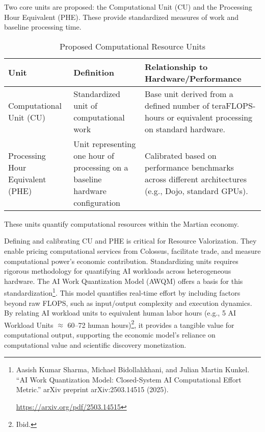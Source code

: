 \documentclass[fontsize=10pt, oneside, DIV=calc]{scrartcl}
\begin{document}
\medskip

\noindent
Two core units are proposed: the Computational Unit (CU) and the Processing Hour Equivalent (PHE). These provide standardized measures of work and baseline processing time.

\medskip

\noindent
\begin{table}[htbp]
\centering
\caption{Proposed Computational Resource Units}
\begin{tabularx}{\textwidth}{|X|X|X|}
  \hline
  \textbf{Unit} & \textbf{Definition} & \textbf{Relationship to Hardware/Performance} \\ \hline
  Computational Unit (CU) & Standardized unit of computational work & Base unit derived from a defined number of teraFLOPS-hours or equivalent processing on standard hardware.\\ \hline
  Processing Hour Equivalent (PHE) & Unit representing one hour of processing on a baseline hardware configuration & Calibrated based on performance benchmarks across different architectures (e.g., Dojo, standard GPUs).\\ \hline
\end{tabularx}
\end{table}
\noindent\footnotesize
These units quantify computational resources within the Martian economy.

\medskip

\noindent
Defining and calibrating CU and PHE is critical for Resource Valorization. They enable pricing computational services from Colossus, facilitate trade, and measure computational power's economic contribution. Standardizing units requires rigorous methodology for quantifying AI workloads across heterogeneous hardware. The AI Work Quantization Model (AWQM) offers a basis for this standardization\footnote{Aasish Kumar Sharma, Michael Bidollahkhani, and Julian Martin Kunkel. ``AI Work Quantization Model: Closed-System AI Computational Effort Metric.'' arXiv preprint arXiv:2503.14515 (2025).








\href{https://arxiv.org/pdf/2503.14515}\url{https://arxiv.org/pdf/2503.14515}}. This model quantifies real-time effort by including factors beyond raw FLOPS, such as input/output complexity and execution dynamics. By relating AI workload units to equivalent human labor hours (e.g., 5 AI Workload Units $\approx$ 60--72 human hours)\footnote{Ibid.}, it provides a tangible value for computational output, supporting the economic model's reliance on computational value and scientific discovery monetization.
\end{document}

